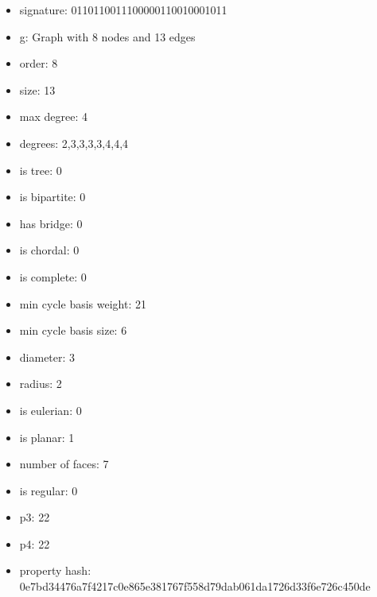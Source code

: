 \begin{itemize}
\item signature: 0110110011100000110010001011
\item g: Graph with 8 nodes and 13 edges
\item order: 8
\item size: 13
\item max degree: 4
\item degrees: 2,3,3,3,3,4,4,4
\item is tree: 0
\item is bipartite: 0
\item has bridge: 0
\item is chordal: 0
\item is complete: 0
\item min cycle basis weight: 21
\item min cycle basis size: 6
\item diameter: 3
\item radius: 2
\item is eulerian: 0
\item is planar: 1
\item number of faces: 7
\item is regular: 0
\item p3: 22
\item p4: 22
\item property hash: 0e7bd34476a7f4217c0e865e381767f558d79dab061da1726d33f6e726c450de
\end{itemize}
\newpage
\begin{figure}
\end{figure}
